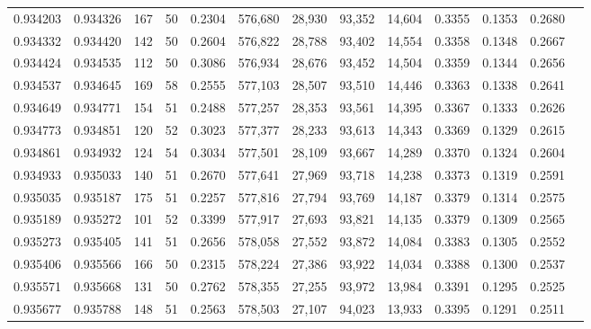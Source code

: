 \begin{tabular}{rrrrrrrrrrrrr}
0.934203 & 0.934326 &   167 &  50 &                                     0.2304 & 576,680 &  28,930 &  93,352 &  14,604 & 0.3355 & 0.1353 & 0.2680 \\
0.934332 & 0.934420 &   142 &  50 &                                     0.2604 & 576,822 &  28,788 &  93,402 &  14,554 & 0.3358 & 0.1348 & 0.2667 \\
0.934424 & 0.934535 &   112 &  50 &                                     0.3086 & 576,934 &  28,676 &  93,452 &  14,504 & 0.3359 & 0.1344 & 0.2656 \\
0.934537 & 0.934645 &   169 &  58 &                                     0.2555 & 577,103 &  28,507 &  93,510 &  14,446 & 0.3363 & 0.1338 & 0.2641 \\
0.934649 & 0.934771 &   154 &  51 &                                     0.2488 & 577,257 &  28,353 &  93,561 &  14,395 & 0.3367 & 0.1333 & 0.2626 \\
0.934773 & 0.934851 &   120 &  52 &                                     0.3023 & 577,377 &  28,233 &  93,613 &  14,343 & 0.3369 & 0.1329 & 0.2615 \\
0.934861 & 0.934932 &   124 &  54 &                                     0.3034 & 577,501 &  28,109 &  93,667 &  14,289 & 0.3370 & 0.1324 & 0.2604 \\
0.934933 & 0.935033 &   140 &  51 &                                     0.2670 & 577,641 &  27,969 &  93,718 &  14,238 & 0.3373 & 0.1319 & 0.2591 \\
0.935035 & 0.935187 &   175 &  51 &                                     0.2257 & 577,816 &  27,794 &  93,769 &  14,187 & 0.3379 & 0.1314 & 0.2575 \\
0.935189 & 0.935272 &   101 &  52 &                                     0.3399 & 577,917 &  27,693 &  93,821 &  14,135 & 0.3379 & 0.1309 & 0.2565 \\
0.935273 & 0.935405 &   141 &  51 &                                     0.2656 & 578,058 &  27,552 &  93,872 &  14,084 & 0.3383 & 0.1305 & 0.2552 \\
0.935406 & 0.935566 &   166 &  50 &                                     0.2315 & 578,224 &  27,386 &  93,922 &  14,034 & 0.3388 & 0.1300 & 0.2537 \\
0.935571 & 0.935668 &   131 &  50 &                                     0.2762 & 578,355 &  27,255 &  93,972 &  13,984 & 0.3391 & 0.1295 & 0.2525 \\
0.935677 & 0.935788 &   148 &  51 &                                     0.2563 & 578,503 &  27,107 &  94,023 &  13,933 & 0.3395 & 0.1291 & 0.2511 \\

\end{tabular}
